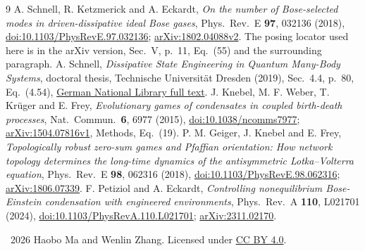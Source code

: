 \documentclass[11pt]{article}
\begin{document}
\begin{thebibliography}{9}\small
\setlength{\itemsep}{3pt}
A. Schnell, R. Ketzmerick and A. Eckardt,
\emph{On the number of Bose-selected modes in driven-dissipative
ideal Bose gases}, Phys.\ Rev.\ E \textbf{97}, 032136 (2018),
\href{https://doi.org/10.1103/PhysRevE.97.032136}{doi:10.1103/PhysRevE.97.032136};
\href{https://arxiv.org/abs/1802.04088v2}{arXiv:1802.04088v2}.
The posing locator used here is in the arXiv version, Sec.\ V,
p.\ 11, Eq.\ (55) and the surrounding paragraph.
A. Schnell, \emph{Dissipative State Engineering in Quantum
Many-Body Systems}, doctoral thesis, Technische Universit\"at
Dresden (2019), Sec.\ 4.4, p.\ 80, Eq.\ (4.54),
\href{https://d-nb.info/1226942288/34}{German National Library full text}.
J. Knebel, M. F. Weber, T. Kr\"uger and E. Frey,
\emph{Evolutionary games of condensates in coupled birth-death
processes}, Nat.\ Commun.\ \textbf{6}, 6977 (2015),
\href{https://doi.org/10.1038/ncomms7977}{doi:10.1038/ncomms7977};
\href{https://arxiv.org/abs/1504.07816v1}{arXiv:1504.07816v1},
Methods, Eq.\ (19).
P. M. Geiger, J. Knebel and E. Frey,
\emph{Topologically robust zero-sum games and Pfaffian orientation:
How network topology determines the long-time dynamics of the
antisymmetric Lotka--Volterra equation},
Phys.\ Rev.\ E \textbf{98}, 062316 (2018),
\href{https://doi.org/10.1103/PhysRevE.98.062316}{doi:10.1103/PhysRevE.98.062316};
\href{https://arxiv.org/abs/1806.07339}{arXiv:1806.07339}.
F. Petiziol and A. Eckardt,
\emph{Controlling nonequilibrium Bose-Einstein condensation with
engineered environments}, Phys.\ Rev.\ A \textbf{110}, L021701 (2024),
\href{https://doi.org/10.1103/PhysRevA.110.L021701}{doi:10.1103/PhysRevA.110.L021701};
\href{https://arxiv.org/abs/2311.02170}{arXiv:2311.02170}.
\end{thebibliography}
\medskip
\noindent\small\textcopyright\ 2026 Haobo Ma and Wenlin Zhang.
Licensed under \href{https://creativecommons.org/licenses/by/4.0/}{CC BY 4.0}.
\end{document}

